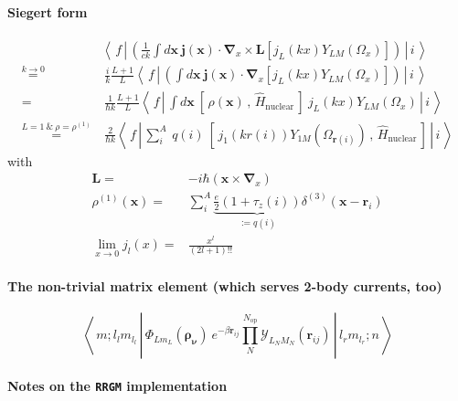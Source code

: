 \documentclass[onecolumn,preprint,superscriptaddress,nofootinbib,notitlepage,10pt,linenumbers]{revtex4-1}
\newcommand{\be}{\begin{equation}}
\newcommand{\ee}{\end{equation}}
\newcommand{\la}{\label}
\newcommand{\ve}[1]{\ensuremath{\boldsymbol{#1}}}
\newcommand{\me}[3] {\left\langle\,#1\,\left|\left.\,#2\,\right|\,#3\,\right.\right\rangle}
\begin{document}
\paragraph{Siegert form}
\begin{align}\la{eq.siegert}
&\me{f}{\left(\frac{1}{ck}\int d\ve{x}~\ve{j}(\ve{x})\cdot\ve{\nabla}_x\times\ve{L}\left[j_L(kx)Y_{LM}(\Omega_x)\right]\right)}{i}
\\[1em]
\overset{\scriptstyle k\to 0}{=}&~\frac{i}{k}\frac{L+1}{L}\me{f}{\left(\int d\ve{x}~\ve{j}(\ve{x})\cdot\ve{\nabla}_x\left[j_L(kx)Y_{LM}(\Omega_x)\right]\right)}{i}
\\[1em]
=&~\frac{1}{\hbar k}\frac{L+1}{L}\me{f}{\int d\ve{x}~\left[\,\rho(\ve{x})\,,\,\hat{H}_\text{nuclear}\,\right]~j_L(kx)Y_{LM}(\Omega_x)}{i}\\[1em]
\overset{\scriptstyle L=1~\&~\rho=\rho^{(1)}}{=}&~\frac{2}{\hbar k}\me{f}{\sum\limits_i^A~q(i)~\left[\,j_1(kr(i))Y_{1M}(\Omega_{\ve{r}(i)})\,,\,\hat{H}_\text{nuclear}\,\right]}{i}
\end{align}
with
\begin{align}\la{eq.siegert.descr}
\ve{L}=&-i\hbar\left(\ve{x}\times\ve{\nabla}_x\right)\\
\rho^{(1)}(\ve{x})=&\sum\limits_i^A\underbrace{\frac{e}{2}(1+\tau_z(i))}_{:=q(i)}\delta^{(3)}(\ve{x}-\ve{r}_i)\\
\lim\limits_{x\to 0}j_l(x)=&\frac{x^l}{(2l+1)!!}
\end{align}

\paragraph{The non-trivial matrix element (which serves {\bf 2-body} currents, too)}
\be\la{eq.theme}
\me{m;l_lm_{l_l}}{\Phi_{Lm_L}(\ve{\rho_\nu})~e^{-\beta\ve{r}_{ij}}\prod\limits_{N}^{N_{\text{op}}}\mathcal{Y}_{L_NM_N}(\ve{r}_{ij})}{l_rm_{l_r};n}
\ee

\paragraph{Notes on the \texttt{RRGM} implementation}



\end{document}
